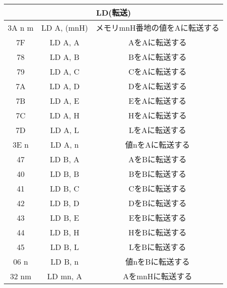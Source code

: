 \begin{center}
\begin{tabular}{|c|c|c|}
\hline
\multicolumn{3}{|c|}{LD(転送)}\\
\hline
3A n m& LD A, (mnH)&  メモリmnH番地の値をAに転送する\\ \hline
7F& LD A, A & AをAに転送する  \\ \hline
78& LD A, B & BをAに転送する  \\ \hline
79& LD A, C & CをAに転送する \\ \hline
7A& LD A, D & DをAに転送する \\ \hline
7B& LD A, E & EをAに転送する \\ \hline
7C& LD A, H & HをAに転送する \\ \hline
7D& LD A, L & LをAに転送する \\ \hline
3E n&  LD A, n  & 値nをAに転送する\\ \hline
47& LD B, A & AをBに転送する  \\ \hline
40& LD B, B & BをBに転送する  \\ \hline
41& LD B, C & CをBに転送する  \\ \hline
42& LD B, D & DをBに転送する  \\ \hline
43& LD B, E & EをBに転送する  \\ \hline
44& LD B, H & HをBに転送する  \\ \hline
45& LD B, L & LをBに転送する  \\ \hline
06 n& LD B, n & 値nをBに転送する  \\ \hline
32 nm& LD mn, A & AをmnHに転送する  \\ \hline
\end{tabular}
\end{center}


\newpage



